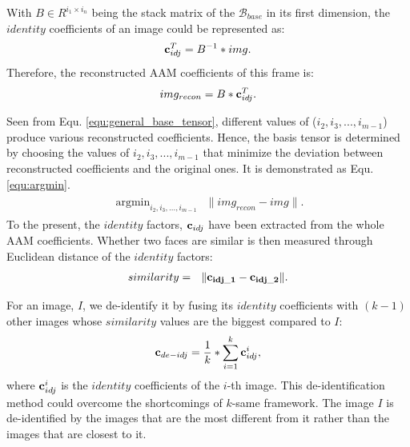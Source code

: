 	With $B \in R^{i_1 \times i_n}$ being the stack matrix of the $\mathcal{B}_{base}$ in its first dimension, the $identity$ coefficients of
	an image could be represented as:
	\begin{align}
		\label{equ:identity_coeff}
		\begin{split}
			{\bf{c}}_{idj}^T = B^{-1} * img.
		\end{split}
	\end{align}
	Therefore, the reconstructed AAM coefficients of this frame is:
	\begin{align}
		\label{equ:img_recon}
		\begin{split}
			img_{recon} = B * {\bf c}_{idj}^T.
		\end{split}
	\end{align}

	Seen from Equ. \ref{equ:general_base_tensor}, different values of ($i_2,i_3,...,i_{m-1}$) produce various 
	reconstructed coefficients. Hence, the basis tensor is determined by choosing the values of $i_2,i_3,...
	,i_{m-1}$ that minimize the deviation between reconstructed coefficients and the original ones. It is demonstrated
	as Equ. \ref{equ:argmin}.
	\begin{align}
		\label{equ:argmin}
		\begin{split}
			\mathop{\arg\min}_{i_2,i_3,...,i_{m-1}} \ \ \| img_{recon} - img\|.
		\end{split}
	\end{align}
	To the present, the $identity$ factors, ${\bf c}_{idj}$ have been extracted from the whole AAM coefficients.
	Whether two faces are similar is then measured through Euclidean distance of the $identity$ factors:
	\begin{equation}
    \label{equ:similarity}
      \begin{aligned}
        similarity = \ \ \| {\bf c_{idj\_1} }  - {\bf c_{idj\_2} }\| .
      \end{aligned}
    \end{equation}

    For an image, $I$, we de-identify it by fusing its $identity$ coefficients with $(k-1)$ other images whose $similarity$
    values are the biggest compared to $I$: 
	\begin{align}
		\label{equ:mean_idj}
		\begin{split}
			{\bf c}_{de-idj} = \frac{1}k * \sum_{i=1}^{k} {\bf c}_{idj}^i,
		\end{split}
	\end{align}
	where ${\bf c}_{idj}^i$ is the $identity$ coefficients of the $i$-th image. This de-identification method could overcome the 
	shortcomings of $k$-same framework. The image $I$ is de-identified by the images that are the most different from it rather
	than the images that are closest to it. 

